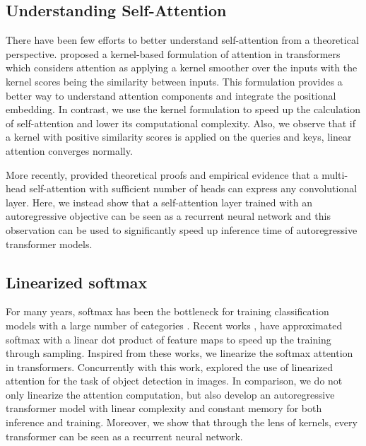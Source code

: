 \documentclass{article}
\begin{document}
\subsection{Understanding Self-Attention}

There have been few efforts to better understand self-attention from a
theoretical perspective. \citet{tsai2019transformer} proposed a kernel-based
formulation of attention in transformers which considers attention as applying
a kernel smoother over the inputs with the kernel scores being the similarity
between inputs. This formulation provides a better way to understand attention
components and integrate the positional embedding. In contrast, we use the
kernel formulation to speed up the calculation of self-attention and lower its
computational complexity. Also, we observe that if a kernel with positive
similarity scores is applied on the queries and keys, linear attention
converges normally.

More recently, \citet{Cordonnier2020On} provided theoretical proofs and
empirical evidence that a multi-head self-attention with sufficient number of
heads can express any convolutional layer. Here, we instead show that a
self-attention layer trained with an autoregressive objective can be seen as a
recurrent neural network and this observation can be used to significantly
speed up inference time of autoregressive transformer models.

\subsection{Linearized softmax}

For many years, softmax has been the bottleneck for training classification
models with a large number of categories \cite{goodman2001classes,
morin2005hierarchical, mnih2009scalable}. Recent works \cite{blanc2017adaptive,
rawat2019sampled}, have approximated softmax with a linear dot product of
feature maps to speed up the training through sampling. Inspired from these
works, we linearize the softmax attention in transformers. Concurrently with
this work, \citet{shen2020efficient} explored the use of linearized attention for
the task of object detection in images. In comparison, we do not only linearize the
attention computation, but also develop an autoregressive transformer model with
linear complexity and constant memory for both inference and training.
Moreover, we show that through the lens of kernels, every transformer can be
seen as a recurrent neural network.
\end{document}
